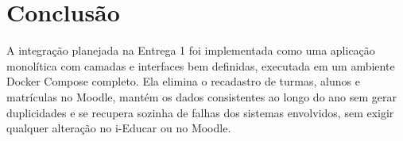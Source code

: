 \documentclass[12pt]{article}
\begin{document}
\section{Conclusão}

A integração planejada na Entrega 1 foi implementada como uma aplicação
monolítica com camadas e interfaces bem definidas, executada em um ambiente
Docker Compose completo. Ela elimina o recadastro de turmas, alunos e
matrículas no Moodle, mantém os dados consistentes ao longo do ano sem gerar
duplicidades e se recupera sozinha de falhas dos sistemas envolvidos, sem
exigir qualquer alteração no i-Educar ou no Moodle.



\end{document}
